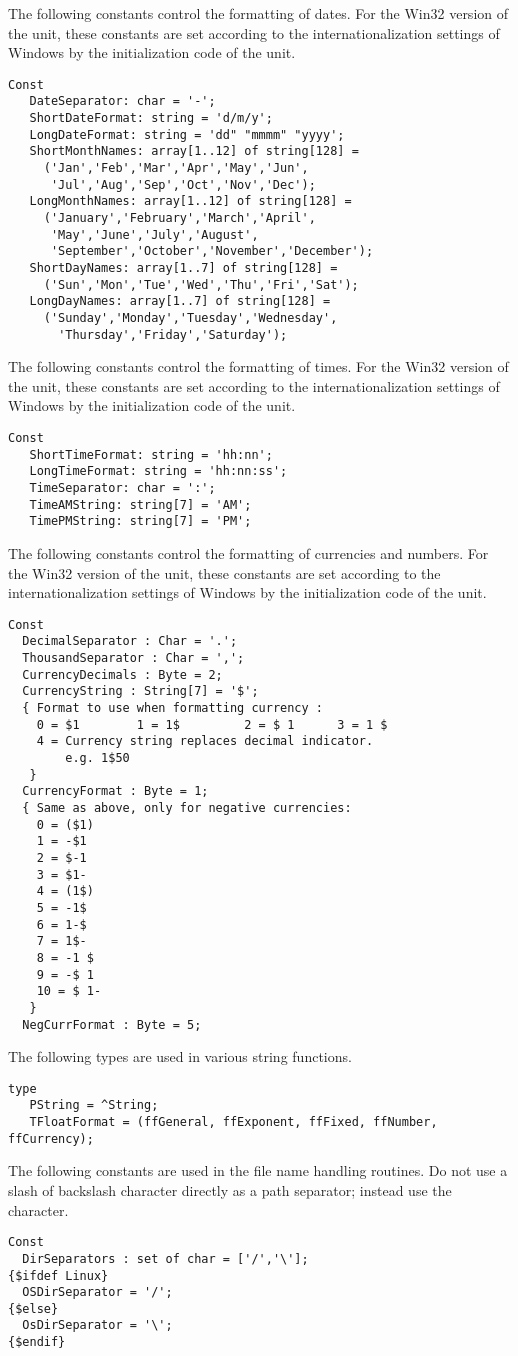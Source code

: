 The following constants control the formatting of dates.
For the Win32 version of the  unit, these 
constants are set according to the internationalization 
settings of Windows by the initialization code of the unit.
\begin{verbatim}
Const 
   DateSeparator: char = '-';
   ShortDateFormat: string = 'd/m/y';
   LongDateFormat: string = 'dd" "mmmm" "yyyy';
   ShortMonthNames: array[1..12] of string[128] =
     ('Jan','Feb','Mar','Apr','May','Jun',
      'Jul','Aug','Sep','Oct','Nov','Dec');
   LongMonthNames: array[1..12] of string[128] =
     ('January','February','March','April',
      'May','June','July','August',
      'September','October','November','December');
   ShortDayNames: array[1..7] of string[128] =
     ('Sun','Mon','Tue','Wed','Thu','Fri','Sat');
   LongDayNames: array[1..7] of string[128] =
     ('Sunday','Monday','Tuesday','Wednesday',
       'Thursday','Friday','Saturday');
\end{verbatim}  

The following constants control the formatting of times.
For the Win32 version of the  unit, these 
constants are set according to the internationalization 
settings of Windows by the initialization code of the unit.
\begin{verbatim}
Const
   ShortTimeFormat: string = 'hh:nn';
   LongTimeFormat: string = 'hh:nn:ss';
   TimeSeparator: char = ':';
   TimeAMString: string[7] = 'AM';
   TimePMString: string[7] = 'PM';
\end{verbatim}

The following constants control the formatting of currencies 
and numbers. For the Win32 version of the  unit, 
these  constants are set according to the internationalization 
settings of Windows by the initialization code of the unit.
\begin{verbatim}
Const
  DecimalSeparator : Char = '.';
  ThousandSeparator : Char = ',';
  CurrencyDecimals : Byte = 2;
  CurrencyString : String[7] = '$';
  { Format to use when formatting currency :
    0 = $1        1 = 1$         2 = $ 1      3 = 1 $
    4 = Currency string replaces decimal indicator. 
        e.g. 1$50 
   }
  CurrencyFormat : Byte = 1;
  { Same as above, only for negative currencies:
    0 = ($1)
    1 = -$1
    2 = $-1
    3 = $1-
    4 = (1$)
    5 = -1$
    6 = 1-$
    7 = 1$-
    8 = -1 $
    9 = -$ 1
    10 = $ 1-
   }
  NegCurrFormat : Byte = 5;
\end{verbatim}
The following types are used in various string functions.
\begin{verbatim}
type
   PString = ^String;
   TFloatFormat = (ffGeneral, ffExponent, ffFixed, ffNumber, ffCurrency);
\end{verbatim}
The following constants are used in the file name handling routines. Do not
use a slash of backslash character directly as a path separator; instead 
use the  character.
\begin{verbatim}
Const
  DirSeparators : set of char = ['/','\'];  
{$ifdef Linux}
  OSDirSeparator = '/';
{$else}
  OsDirSeparator = '\';
{$endif}
\end{verbatim}

